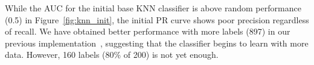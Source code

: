 While the AUC for the initial base KNN classifier is above random performance (0.5) in Figure~\ref{fig:knn_init}, 
the initial PR curve shows poor precision regardless of recall.
We have obtained better performance with more labels (897) in our previous implementation~\cite{tchoua2019polyner}, suggesting that the classifier begins to learn with more data. 
However, 160 labels (80\% of 200) is not yet enough. %



